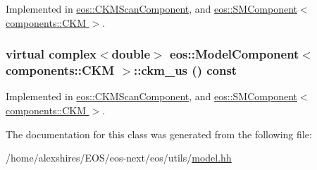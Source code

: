 Implemented in \hyperlink{classeos_1_1CKMScanComponent_a18ccfd1e6541233a32870e8d20ba4a1e}{eos::CKMScanComponent}, and \hyperlink{classeos_1_1SMComponent_3_01components_1_1CKM_01_4_a850dc3770b53e2cf3e8cfeb466ee311e}{eos::SMComponent$<$ components::CKM $>$}.\hypertarget{classeos_1_1ModelComponent_3_01components_1_1CKM_01_4_ac3363cbfe22a4354e833a67fdc5ed1fa}{
\subsubsection[{ckm\_\-us}]{\setlength{\rightskip}{0pt plus 5cm}virtual complex$<$double$>$ eos::ModelComponent$<$ components::CKM $>$::ckm\_\-us () const}}
\label{classeos_1_1ModelComponent_3_01components_1_1CKM_01_4_ac3363cbfe22a4354e833a67fdc5ed1fa}


Implemented in \hyperlink{classeos_1_1CKMScanComponent_a1ac8c31a252962bd381b604a60fe914d}{eos::CKMScanComponent}, and \hyperlink{classeos_1_1SMComponent_3_01components_1_1CKM_01_4_a4dcb7f6ada6e03fd3810c4c98c9cffa8}{eos::SMComponent$<$ components::CKM $>$}.

The documentation for this class was generated from the following file:\begin{DoxyCompactItemize}
\item 
/home/alexshires/EOS/eos-\/next/eos/utils/\hyperlink{model_8hh}{model.hh}\end{DoxyCompactItemize}
